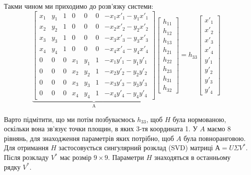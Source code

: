 Такми чином ми приходимо до розв'язку системи:
\begin{equation}
    \underbrace{
        \begin{bmatrix}
            x_1 & y_1 & 1 & 0   & 0   & 0 & -x_1x'_1 -y_1x'_1 \\
            x_2 & y_2 & 1 & 0   & 0   & 0 & -x_2x'_2 -y_2x'_2 \\
            x_3 & y_3 & 1 & 0   & 0   & 0 & -x_3x'_3 -y_3x'_3 \\
            x_4 & y_4 & 1 & 0   & 0   & 0 & -x_4x'_4 -y_4x'_4 \\
            0   & 0   & 0 & x_1 & y_1 & 1 & -x_1y'_1 -y_1y'_1 \\
            0   & 0   & 0 & x_2 & y_2 & 1 & -x_2y'_2 -y_2y'_2 \\
            0   & 0   & 0 & x_3 & y_3 & 1 & -x_3y'_3 -y_3y'_3 \\
            0   & 0   & 0 & x_4 & y_4 & 1 & -x_4y'_4 -y_4y'_4
        \end{bmatrix}
    }_\textrm{A}
    \begin{bmatrix}
        h_{11} \\
        h_{12} \\
        h_{13} \\
        h_{21} \\
        h_{22} \\
        h_{23} \\
        h_{31} \\
        h_{32}
    \end{bmatrix}
    =
    h_{33}
    \begin{bmatrix}
        x'_1 \\
        x'_2 \\
        x'_3 \\
        x'_4 \\
        y'_1 \\
        y'_2 \\
        y'_3 \\
        y'_4
    \end{bmatrix}
\end{equation}

Варто підмітити, що ми потім  позбуваємось  $h_{33}$, щоб $H$ була нормованою, оскільки вона
зв'язує точки площин, в яких 3-тя координата 1.
У $A$ маємо 8 рівнянь, для знаходження параметрів яких потрібно, щоб $A$ була повноранговою.
Для отримання $H$ застосовується сингулярний розклад (SVD) матриці $А = U\Sigma V^*$.
Після розкладу $V^*$ має розмір $9\times9$. Параметри $H$ знаходяться в останньому рядку $V^*$.

